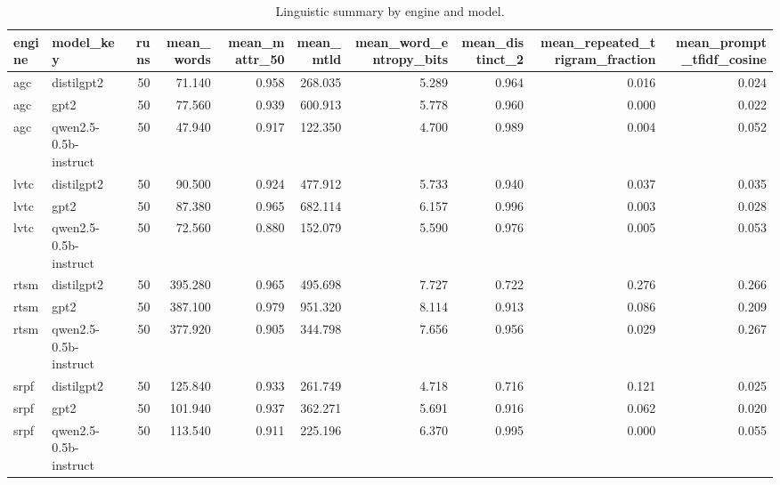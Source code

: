 \begin{table}[t]
\centering
\caption{Linguistic summary by engine and model.}
\label{tab:linguistics_summary}
\begin{tabular}{llrrrrrrrr}
\toprule
engine & model\_key & runs & mean\_words & mean\_mattr\_50 & mean\_mtld & mean\_word\_entropy\_bits & mean\_distinct\_2 & mean\_repeated\_trigram\_fraction & mean\_prompt\_tfidf\_cosine \\
\midrule
agc & distilgpt2 & 50 & 71.140 & 0.958 & 268.035 & 5.289 & 0.964 & 0.016 & 0.024 \\
agc & gpt2 & 50 & 77.560 & 0.939 & 600.913 & 5.778 & 0.960 & 0.000 & 0.022 \\
agc & qwen2.5-0.5b-instruct & 50 & 47.940 & 0.917 & 122.350 & 4.700 & 0.989 & 0.004 & 0.052 \\
lvtc & distilgpt2 & 50 & 90.500 & 0.924 & 477.912 & 5.733 & 0.940 & 0.037 & 0.035 \\
lvtc & gpt2 & 50 & 87.380 & 0.965 & 682.114 & 6.157 & 0.996 & 0.003 & 0.028 \\
lvtc & qwen2.5-0.5b-instruct & 50 & 72.560 & 0.880 & 152.079 & 5.590 & 0.976 & 0.005 & 0.053 \\
rtsm & distilgpt2 & 50 & 395.280 & 0.965 & 495.698 & 7.727 & 0.722 & 0.276 & 0.266 \\
rtsm & gpt2 & 50 & 387.100 & 0.979 & 951.320 & 8.114 & 0.913 & 0.086 & 0.209 \\
rtsm & qwen2.5-0.5b-instruct & 50 & 377.920 & 0.905 & 344.798 & 7.656 & 0.956 & 0.029 & 0.267 \\
srpf & distilgpt2 & 50 & 125.840 & 0.933 & 261.749 & 4.718 & 0.716 & 0.121 & 0.025 \\
srpf & gpt2 & 50 & 101.940 & 0.937 & 362.271 & 5.691 & 0.916 & 0.062 & 0.020 \\
srpf & qwen2.5-0.5b-instruct & 50 & 113.540 & 0.911 & 225.196 & 6.370 & 0.995 & 0.000 & 0.055 \\
\bottomrule
\end{tabular}
\end{table}




